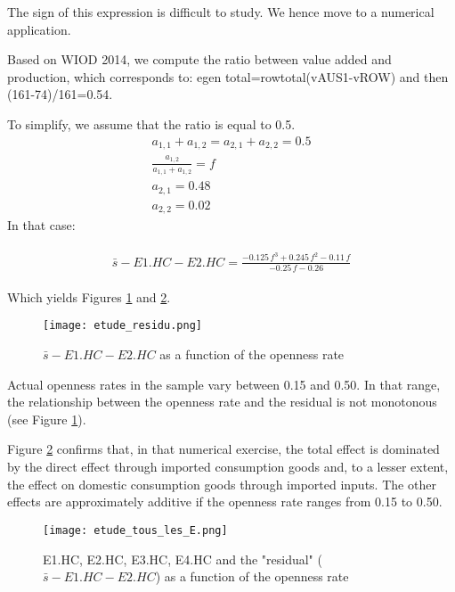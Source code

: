 \documentclass[11pt,a4paper]{article} %
\begin{document}
The sign of this expression is difficult to study. We hence move to a numerical application.

Based on WIOD 2014, we compute the ratio between value added and production, which corresponds to: 
egen total=rowtotal(vAUS1-vROW) and then (161-74)/161=0.54.

To simplify, we assume that the ratio is equal to 0.5.
\begin{gather*}
a_{1,1}+a_{1,2}=a_{2,1}+a_{2,2}=0.5 \\
\frac{a_{1,2}}{a_{1,1}+a_{1,2}}=f \\
a_{2,1}=0.48 \\
a_{2,2}=0.02
\end{gather*}
In that case:

\begin{gather*}
\begin{array}{r}
\bar{s}-E1.HC-E2.HC = \frac{-0.125 \, f^{3} + 0.245 \, f^{2} - 0.11 \, f}{-0.25 \, f - 0.26
}
\end{array}
\end{gather*}

Which yields Figures \ref{fig:resid} and \ref{fig:tous_les_E}.
\begin{figure}[H]
	\begin{center}
		\texttt{[image: etude\_residu.png]}
		\caption{$\bar{s}-E1.HC-E2.HC$ as a function of the openness rate}
		\label{fig:resid}
	\end{center}
\end{figure}

Actual openness rates in the sample vary between 0.15 and 0.50. In that range, the relationship between the openness rate and the residual is not monotonous (see Figure \ref{fig:resid}).

Figure \ref{fig:tous_les_E} confirms that, in that numerical exercise, the total effect is dominated by the direct effect through imported consumption goods and, to a lesser extent, the effect on domestic consumption goods through imported inputs. 
The other effects are approximately additive if the openness rate ranges from 0.15 to 0.50.

\begin{figure}[H]
	\begin{center}
		\texttt{[image: etude\_tous\_les\_E.png]}
		\caption{E1.HC, E2.HC, E3.HC, E4.HC and the "residual"  ($\bar{s}-E1.HC-E2.HC$) as a function of the openness rate}
		\label{fig:tous_les_E}
	\end{center}
\end{figure}
\end{document}
